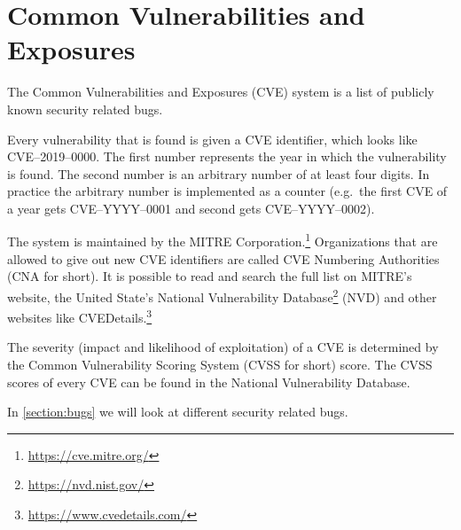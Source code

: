 \section{Common Vulnerabilities and Exposures}
The Common Vulnerabilities and Exposures (CVE) system is a list of publicly known security related bugs. 

Every vulnerability that is found is given a CVE identifier, which looks like CVE--2019--0000. The first number represents the year in which the vulnerability is found. The second number is an arbitrary number of at least four digits. In practice the arbitrary number is implemented as a counter (e.g.\ the first CVE of a year gets CVE--YYYY--0001 and second gets CVE--YYYY--0002).

The system is maintained by the MITRE Corporation.\footnote{\url{https://cve.mitre.org/}} Organizations that are allowed to give out new CVE identifiers are called CVE Numbering Authorities (CNA for short). It is possible to read and search the full list on MITRE's website, the United State's National Vulnerability Database\footnote{\url{https://nvd.nist.gov/}} (NVD) and other websites like CVEDetails.\footnote{\url{https://www.cvedetails.com/}}

\medskip

The severity (impact and likelihood of exploitation) of a CVE is determined by the Common Vulnerability Scoring System (CVSS for short) score. The CVSS scores of every CVE can be found in the National Vulnerability Database.

\medskip

In \autoref{section:bugs} we will look at different security related bugs.
